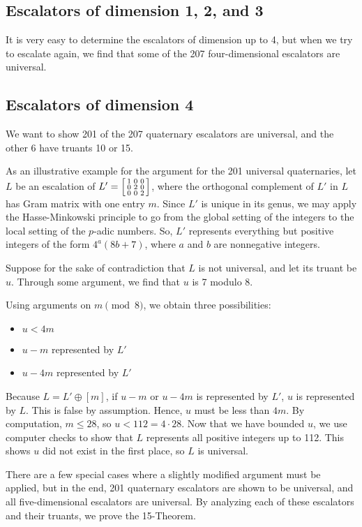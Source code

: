 \documentclass[letterpaper, 12pt]{article}
\begin{document}
\subsection{Escalators of dimension 1, 2, and 3}
It is very easy to determine the escalators of dimension up to 4, but when we try to escalate again, we find that some of the 207 four-dimensional escalators are universal.

\subsection{Escalators of dimension 4}
We want to show 201 of the 207 quaternary escalators are universal, and the other 6 have truants 10 or 15.

As an illustrative example for the argument for the 201 universal quaternaries, let $L$ be an escalation of $L' = \begin{bsmallmatrix} 1 & 0 & 0 \\ 0 & 2 & 0 \\ 0 & 0 & 2 \end{bsmallmatrix}$, where the orthogonal complement of $L'$ in $L$ has Gram matrix with one entry $m$. Since $L'$ is unique in its genus, we may apply the Hasse-Minkowski principle to go from the global setting of the integers to the local setting of the $p$-adic numbers. So, $L'$ represents everything but positive integers of the form $4^a (8b + 7)$, where $a$ and $b$ are nonnegative integers.

Suppose for the sake of contradiction that $L$ is not universal, and let its truant be $u$. Through some argument, we find that $u$ is 7 modulo 8.

Using arguments on $m \pmod 8$, we obtain three possibilities:
\begin{itemize}
    \item $u < 4m$
    \item $u - m$ represented by $L'$
    \item $u - 4m$ represented by $L'$
\end{itemize}
Because $L = L' \oplus [m]$, if $u - m$ or $u - 4m$ is represented by $L'$, $u$ is represented by $L$. This is false by assumption. Hence, $u$ must be less than $4m$. By computation, $m \le 28$, so $u < 112 = 4 \cdot 28$. Now that we have bounded $u$, we use computer checks to show that $L$ represents all positive integers up to 112. This shows $u$ did not exist in the first place, so $L$ is universal.

There are a few special cases where a slightly modified argument must be applied, but in the end, 201 quaternary escalators are shown to be universal, and all five-dimensional escalators are universal. By analyzing each of these escalators and their truants, we prove the 15-Theorem.
\end{document}
